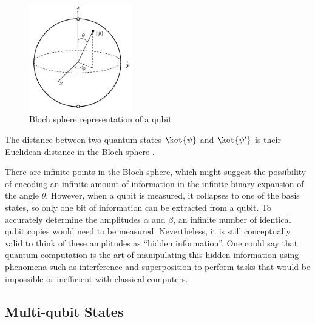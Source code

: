 \begin{figure} [H] 
  \centering
  \includegraphics[width=0.4\textwidth]{images/bloch_sphere.jpg}
  \caption{Bloch sphere representation of a qubit}
  \label{fig:bloch_sphere}
\end{figure}

The distance between two quantum states $\ket{\psi}$ and $\ket{\psi'}$ is their Euclidean distance in the Bloch sphere \cite{wallman2016noise,nielsen2010quantum}. 

There are infinite points in the Bloch sphere, which might suggest the possibility of encoding an infinite amount of information in the infinite binary expansion of the angle $\theta$. However, when a qubit is measured, it collapses to one of the basis states, so only one bit of information can be extracted from a qubit. To accurately determine the amplitudes $\alpha$ and $\beta$, an infinite number of identical qubit copies would need to be measured. Nevertheless, it is still conceptually valid to think of these amplitudes as ``hidden information''. One could say that quantum computation is the art of manipulating this hidden information using phenomena such as interference and superposition to perform tasks that would be impossible or inefficient with classical computers.



\subsection{Multi-qubit States} \label{subsec:entanglement}

